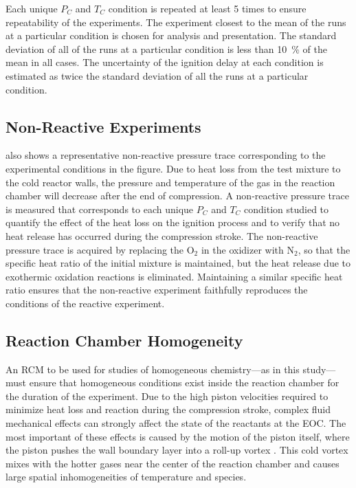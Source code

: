 \documentclass[../main.tex]{subfiles}
\begin{document}
Each unique $P_C$ and $T_C$ condition is repeated at least 5 times to
ensure repeatability of the experiments. The experiment closest to the
mean of the runs at a particular condition is chosen for analysis and
presentation. The standard deviation of all of the runs at a particular
condition is less than \SI{10}{\percent} of the mean in all cases. The uncertainty of
the ignition delay at each condition is estimated as twice the standard
deviation of all the runs at a particular condition.

\subsection{Non-Reactive Experiments}

 also shows a representative non-reactive pressure
trace corresponding to the experimental conditions in the figure.
Due to heat loss from the test mixture to the cold reactor walls,
the pressure and temperature of the gas in the reaction chamber will
decrease after the end of compression. A non-reactive pressure trace
is measured that corresponds to each unique $P_C$ and $T_C$ condition
studied to quantify the effect of the heat loss on the ignition process
and to verify that no heat release has occurred during the compression
stroke. The non-reactive pressure trace is acquired by replacing the
O$_2$ in the oxidizer with N$_2$, so that the specific heat ratio
of the initial mixture is maintained, but the heat release due to
exothermic oxidation reactions is eliminated. Maintaining a similar
specific heat ratio ensures that the non-reactive experiment faithfully
reproduces the conditions of the reactive experiment.


\subsection{Reaction Chamber Homogeneity}

An RCM to be used for studies of homogeneous chemistry---as in this study---%
must ensure that homogeneous conditions exist inside the reaction
chamber for the duration of the experiment. Due to the high piston
velocities required to minimize heat loss and reaction during the
compression stroke, complex fluid mechanical effects can strongly
affect the state of the reactants at the EOC. The most important of these
effects is caused by the motion of the piston itself, where the piston
pushes the wall boundary layer into a roll-up vortex \cite{Lee1998}.
This cold vortex mixes with the hotter gases near the center of
the reaction chamber and causes large spatial inhomogeneities of
temperature and species.
\end{document}
